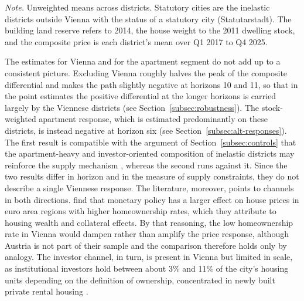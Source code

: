\documentclass[a4paper,12pt, headsepline]{scrartcl}
\newcommand{\figcap}[2]{\caption[#1]{\textbf{#1}\newline #2}}
\numberwithin{equation}{section}
\begin{document}
\begin{table}[H]
	\centering
	\figcap{Characteristics of supply-inelastic and supply-elastic districts}{}\label{tab:supply-groups}
	

	\vspace{0.2cm}
	\begin{minipage}{0.9\textwidth}
		\footnotesize
		\textit{Note.} Unweighted means across districts. Statutory cities are the inelastic districts outside Vienna with the status of a statutory city (Statutarstadt). The building land reserve refers to 2014, the house weight to the 2011 dwelling stock, and the composite price is each district's mean over Q1 2017 to Q4 2025.
	\end{minipage}
\end{table}

The estimates for Vienna and for the apartment segment do not add up to a consistent picture. Excluding Vienna roughly halves the peak of the composite differential and makes the path slightly negative at horizons 10 and 11, so that in the point estimates the positive differential at the longer horizons is carried largely by the Viennese districts (see Section~\ref{subsec:robustness}). The stock-weighted apartment response, which is estimated predominantly on these districts, is instead negative at horizon six (see Section~\ref{subsec:alt-responses}). The first result is compatible with the argument of Section~\ref{subsec:controls} that the apartment-heavy and investor-oriented composition of inelastic districts may reinforce the supply mechanism \citep{biljanovska2025}, whereas the second runs against it. Since the two results differ in horizon and in the measure of supply constraints, they do not describe a single Viennese response. The literature, moreover, points to channels in both directions. \citet{battistini2025} find that monetary policy has a larger effect on house prices in euro area regions with higher homeownership rates, which they attribute to housing wealth and collateral effects. By that reasoning, the low homeownership rate in Vienna would dampen rather than amplify the price response, although Austria is not part of their sample and the comparison therefore holds only by analogy. The investor channel, in turn, is present in Vienna but limited in scale, as institutional investors hold between about 3\% and 11\% of the city's housing units depending on the definition of ownership, concentrated in newly built private rental housing \citep{kadi2025}.
\end{document}
